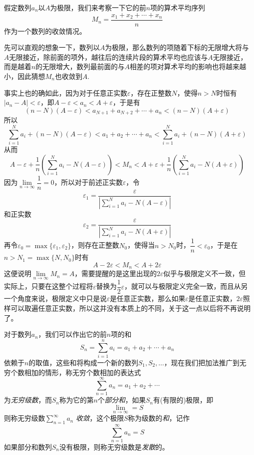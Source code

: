 \begin{example}
  \label{example:mean-value-of-converge-number-sequence}
  假定数列$a_n$以$A$为极限，我们来考察一下它的前$n$项的算术平均序列
  \[ M_n=\frac{x_1+x_2+\cdots+x_n}{n} \]
  作为一个数列的收敛情况。

  先可以直观的想象一下，数列以$A$为极限，那么数列的项随着下标的无限增大将与$A$无限接近，除前面的项外，越往后的连续片段的算术平均也应该与$A$无限接近，而是越着$n$的无限增大，数列最前面的与$A$相差的项对算术平均的影响也将越来越小，因此猜想$M_n$也收敛到$A$.

  事实上也的确如此，因为对于任意正实数$\varepsilon$，存在正整数$N$，使得$n>N$时恒有$|a_n-A|<\varepsilon$，即$A-\varepsilon<a_n<A+\varepsilon$，于是有
  \[ (n-N)(A-\varepsilon) < a_{N+1}+a_{N+2}+\cdots+a_n < (n-N)(A+\varepsilon) \]
  所以
  \[ \sum_{i=1}^Na_i + (n-N)(A-\varepsilon) < a_{1}+a_{2}+\cdots+a_n < \sum_{i=1}^Na_i + (n-N)(A+\varepsilon) \]
  从而
  \[ A-\varepsilon + \frac{1}{n} \left( \sum_{i=1}^Na_i - N(A-\varepsilon) \right) < M_n <  A+\varepsilon + \frac{1}{n} \left( \sum_{i=1}^Na_i - N(A+\varepsilon) \right)\]
  因为$\lim\limits_{n \to \infty}\dfrac{1}{n} = 0$，所以对于前述正实数$\varepsilon$，令
  \[ \varepsilon_1= \frac{\varepsilon}{\left| \sum_{i=1}^Na_i - N(A-\varepsilon) \right|} \]
  和正实数
  \[ \varepsilon_2= \frac{\varepsilon}{\left| \sum_{i=1}^Na_i - N(A+\varepsilon) \right|} \]
  再令$\varepsilon_0=\max\{\varepsilon_1,\varepsilon_2\}$，则存在正整数$N_0$，使得当$n>N_0$时，$\dfrac{1}{n}<\varepsilon_0$，于是在$n>N_1=\max\{N,N_0\}$时有
  \[ A-2\varepsilon < M_n < A+2\varepsilon \]
  这便说明$\lim\limits_{n \to \infty}M_n = A$，需要提醒的是这里出现的$2\varepsilon$似乎与极限定义不一致，但实际上，只要在这整个过程将$\varepsilon$替换为$\dfrac{1}{2}\varepsilon$，就可以与极限定义完全一致，而且从另一个角度来说，极限定义中只是说$\varepsilon$是任意正实数，那么如果$\varepsilon$是任意正实数，$2\varepsilon$照样可以取遍任意正实数，所以这并没有本质上的不同，关于这一点以后将不再说明了。
\end{example}

\begin{example}[无穷级数的和]
  对于数列$a_n$，我们可以作出它的前$n$项的和
  \[ S_n = \sum_{i=1}^n a_i = a_1 + a_2 + \cdots + a_n \]
  依赖于$n$的取值，这些和将构成一个新的数列$S_1,S_2,\ldots$，现在我们把加法推广到无穷个数相加的情形，称无穷个数相加的表达式
  \[ \sum_{n=1}^{\infty} a_n = a_1 + a_2 + \cdots  \]
  为\emph{无穷级数}，而$S_n$称为它的第$n$个\emph{部分和}，如果$S_n$有(有限的)极限，即
  \[ \lim\limits_{n \to \infty} = S \]
  则称无穷级数$\sum\limits_{n=1}^{\infty} a_n$ \emph{收敛}，这个极限$S$称为级数的\emph{和}，记作
  \[ \sum_{n=1}^{\infty} a_n = S \]
  如果部分和数列$S_n$没有极限，则称无穷级数是\emph{发散}的。
\end{example}

